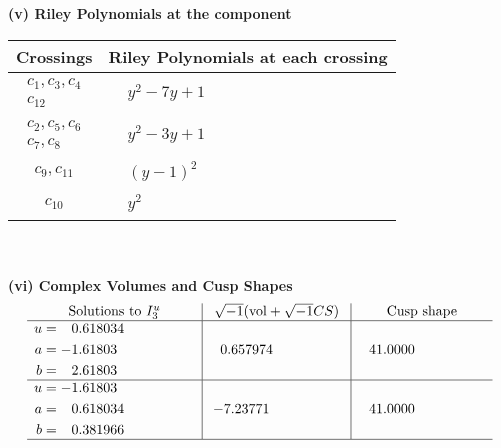 \documentclass[1p]{elsarticle_modified}
\theoremstyle{definition}
\newcommand{\I}{\sqrt{-1}}
\begin{document}
\newpage\renewcommand{\arraystretch}{1}
\flushleft \textbf{(v) Riley Polynomials at the component}\newline \\
\begin{tabular}{m{50pt}|m{274pt}}
Crossings & \hspace{64pt}Riley Polynomials at each crossing \\
\hline $$\begin{aligned}c_{1},c_{3},c_{4}\\c_{12}\end{aligned}$$&$\begin{aligned}
&y^2-7 y+1
\end{aligned}$\\
\hline $$\begin{aligned}c_{2},c_{5},c_{6}\\c_{7},c_{8}\end{aligned}$$&$\begin{aligned}
&y^2-3 y+1
\end{aligned}$\\
\hline $$\begin{aligned}c_{9},c_{11}\end{aligned}$$&$\begin{aligned}
&(y-1)^2
\end{aligned}$\\
\hline $$\begin{aligned}c_{10}\end{aligned}$$&$\begin{aligned}
&y^2
\end{aligned}$\\
\hline
\end{tabular}\\~\\
\newpage\flushleft \textbf{(vi) Complex Volumes and Cusp Shapes}
$$\begin{array}{c|c|c}  
\text{Solutions to }I^u_{3}& \I (\text{vol} + \sqrt{-1}CS) & \text{Cusp shape}\\
 \hline 
\begin{aligned}
u &= \phantom{-}0.618034\phantom{ +0.000000I} \\
a &= -1.61803\phantom{ +0.000000I} \\
b &= \phantom{-}2.61803\phantom{ +0.000000I}\end{aligned}
 & \phantom{-}0.657974\phantom{ +0.000000I} & \phantom{-}41.0000\phantom{ +0.000000I} \\ \hline\begin{aligned}
u &= -1.61803\phantom{ +0.000000I} \\
a &= \phantom{-}0.618034\phantom{ +0.000000I} \\
b &= \phantom{-}0.381966\phantom{ +0.000000I}\end{aligned}
 & -7.23771\phantom{ +0.000000I} & \phantom{-}41.0000\phantom{ +0.000000I}\\
 \hline 
 \end{array}$$\newpage
\end{document}
